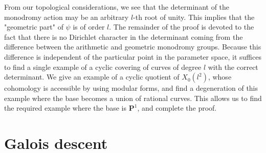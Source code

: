 \documentclass{article}
\theoremstyle{definition}
\begin{document}
	From our topological considerations, we see that the determinant of the monodromy action may be an arbitrary $l$-th root of unity. This implies that the "geometric part" of $\psi$ is of order $l$. The remainder of the proof is devoted to the fact that there is no Dirichlet character in the determinant coming from the difference between the arithmetic and geometric monodromy groups. Because this difference is independent of the particular point in the parameter space, it suffices to find a single example of a cyclic covering of curves of degree $l$ with the correct determinant. We give an example of a cyclic quotient of $X_0(l^2)$, whose cohomology is accessible by using modular forms, and find a degeneration of this example where the base becomes a union of rational curves. This allows us to find the required example where the base is $\mathbf{P}^1$, and complete the proof.
	
	\section{Galois descent}
	
\end{document}
